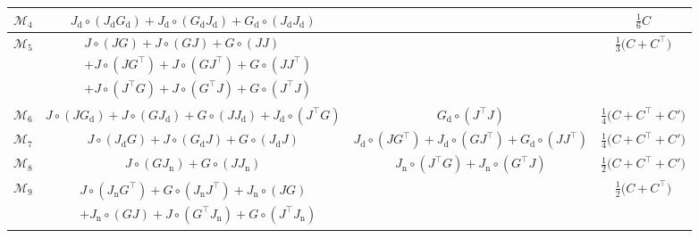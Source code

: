 \documentclass[12pt,draft]{ociamthesis}
\theoremstyle{plain}
\theoremstyle{definition}
\theoremstyle{remark}
\newcommand\ca[1]{\mathcal{#1}}
\begin{document}
\begin{table}[H]
\begin{tabular}{ |c|c|c|c| }
    \hline

    $\ca{M}_4$ & $ J_\mathrm{d} \circ (J_\mathrm{d} G_\mathrm{d}) +
    J_\mathrm{d} \circ (G_\mathrm{d} J_\mathrm{d}) + G_\mathrm{d} \circ
    (J_\mathrm{d} J_\mathrm{d}) $ & & $ \frac{1}{6} C$ \\

    \hline

    $\ca{M}_5$ & \rule{0pt}{2.7em}$\displaystyle
    \begin{aligned}
      & J \circ (J G) + J \circ (G J) + G \circ (J J) \\
      & + J \circ (J G^\top) + J \circ (G J^\top) + G \circ (J J^\top) \\
      & + J \circ (J^\top G) + J \circ (G^\top J) + G \circ (J^\top J)
    \end{aligned}
    $\rule[-2em]{0pt}{1em} & & $\frac{1}{3} \big(C + C^\top\big)$ \\

    \hline

    $\ca{M}_6$ & $J \circ (J G_\mathrm{d}) + J \circ (G J_\mathrm{d}) + G \circ
    (J J_\mathrm{d}) + J_\mathrm{d} \circ (J^\top G)$ & $G_\mathrm{d} \circ
    (J^\top J)$ & $\frac{1}{4} \big(C + C^\top + C' \big)$ \\

    \hline

    $\ca{M}_7$ & $J \circ (J_\mathrm{d} G) + J \circ (G_\mathrm{d} J) + G \circ
    (J_\mathrm{d} J)$ & $J_\mathrm{d} \circ (J G^\top) + J_\mathrm{d} \circ (G
    J^\top) + G_\mathrm{d} \circ (J J^\top)$ & $ \frac{1}{4} \big(C + C^\top +
    C' \big)$ \\

    \hline

    $\ca{M}_8$ & $J \circ (G J_\mathrm{n}) + G \circ (J J_\mathrm{n})$ &
    $J_\mathrm{n} \circ (J^\top G) + J_\mathrm{n} \circ (G^\top J)$ &
    $\frac{1}{2} \big(C + C^\top + C' \big)$ \\

    \hline

    $\ca{M}_9$ & \rule{0pt}{1.9em}$\displaystyle
    \begin{aligned}
      & J \circ (J_\mathrm{n} G^\top) + G \circ (J_\mathrm{n} J^\top) +
      J_\mathrm{n} \circ (J G) \\
      & + J_\mathrm{n} \circ (G J) + J \circ (G^\top J_\mathrm{n}) + G \circ
      (J^\top J_\mathrm{n})
    \end{aligned}
    $\rule[-1.3em]{0pt}{1em} & & $\frac{1}{2} \big(C + C^\top\big)$ \\


\end{tabular}
\end{table}
\end{document}
